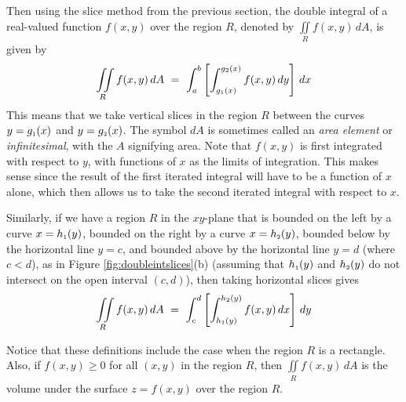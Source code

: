 Then using the slice method from the previous section, the double integral of a real-valued function $f(x,y)$
over the region $R$, denoted by $\displaystyle\iint\limits_{R} f(x,y)\,dA$, is given by
\begin{equation}\label{eqn:doubleintvert}
 \iint\limits_{R} f(x,y)\,dA ~=~ \int_a^b \left[ \int_{g_{\scriptscriptstyle 1}(x)}^{g_{\scriptscriptstyle 2}(x)} f(x,y)\,dy \right] \,dx
\end{equation}
This means that we take vertical slices in the region $R$ between the curves $y=g_{\scriptscriptstyle 1}(x)$ and $y=g_{\scriptscriptstyle 2}(x)$.
The symbol $dA$ is sometimes called an \emph{area element} or \emph{infinitesimal}, with the $A$ signifying area.
Note that $f(x,y)$ is first integrated with respect to $y$, with functions of $x$ as the limits of
integration. This makes sense since the result of the first iterated integral will have to be a function of $x$
alone, which then allows us to take the second iterated integral with respect to $x$.

Similarly, if we have a region $R$ in the $xy$-plane that is bounded on the left by a curve $x=h_{\scriptscriptstyle 1}(y)$,
bounded on the right by a curve $x=h_{\scriptscriptstyle 2}(y)$, bounded below by the horizontal line $y=c$, and bounded above by
the horizontal line $y=d$ (where $c < d$), as in Figure \ref{fig:doubleintslices}(b) (assuming that
$h_{\scriptscriptstyle 1}(y)$ and $h_{\scriptscriptstyle 2}(y)$ do not intersect on the open interval $(c,d)$), then taking horizontal slices
gives
\begin{equation}\label{eqn:doubleinthoriz}
 \iint\limits_{R} f(x,y)\,dA ~=~ \int_c^d \left[ \int_{h_{\scriptscriptstyle 1}(y)}^{h_{\scriptscriptstyle 2}(y)} f(x,y)\,dx \right] \,dy
\end{equation}

Notice that these definitions
include the case when the region $R$ is a rectangle. Also, if $f(x,y) \ge 0$ for all $(x,y)$ in the region $R$,
then $\iint\limits_{R} f(x,y)\,dA$ is the volume under the surface $z=f(x,y)$ over the region $R$.

